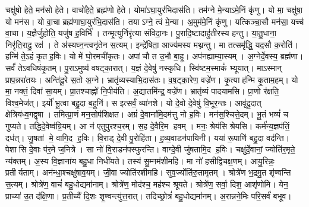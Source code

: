 चक्षु॑षो हेते॒ मन॑सो हेते। वाचो॑हेते॒ ब्रह्म॑णो हेते।
योमा॑ऽघा॒युर॑भिदास॑ति। तम॑ग्ने मे॒न्याऽमे॒निं कृ॑णु।
यो मा॒ चक्षु॑षा॒ यो मन॑स। यो वा॒चा ब्रह्म॑णाघा॒युर॑भि॒दास॑ति।
तयाऽग्ने॒ त्वं मे॒न्या। अ॒मुम॑मे॒निं कृ॑णु।
यत्किञ्चा॒सौ मन॑सा॒ यच्च॑ वा॒चा। य॒ज्ञैर्जु॒होति॒ यजु॑ष ह॒विर्भि॑।
तन्मृ॒त्युर्निरृ॑त्या संविदा॒नः। पु॒रादि॒ष्टादाहु॑तीरस्य हन्तु।
या॒तु॒धाना॒ निरृ॑ति॒रादु॒ रक्ष॑। ते अ॑स्यघ्न॒न्त्वनृ॑तेन स॒त्यम्।
इन्द्रे॑षिता॒ आज्य॑मस्य मथ्नन्तु। मा तत्समृ॑द्धि॒ यद॒सौ क॒रोति॑।
हन्मि॑ ते॒ऽहं कृ॒तह॒विः। यो मे॑ घो॒रमची॑कृतः।
अपांचौ त उ॒भौ बा॒हू। अप॑नह्याम्या॒स्यम्।
अ॒ग्नेर्दे॒वस्य॒ ब्रह्म॑णा। सर्वं॑ तेऽवधिषंकृ॒तम्।
पु॒राऽमुष्य॑ वषट्का॒रात्। य॒ज्ञं दे॒वेषु॑ नस्कृधि।
स्वि॑ष्टम॒स्माकं॑ भ्यूयात्। माऽस्मान् प्राप॒न्नरा॑तयः।
अन्ति॑दू॒रे स॒तो अ॒ग्ने। भ्रातृ॑व्यस्याभि॒दास॑तः।
व॒ष॒ट्का॒रेण॒ वज्रे॑ण। कृ॒त्याह॑न्मि कृ॒ताम॒हम्।
यो मा॒ नक्तं॒ दिवा॑ सा॒यम्। प्रा॒तश्चाह्नो॑ नि॒पीय॑ति।
अ॒द्यातमि॑न्द्र॒ वज्रे॑ण। भ्रातृ॑व्यं पादयामसि।
प्रा॒णो र॑क्षति॒ विश्व॒मेज॑त्। इर्यो॑ भू॒त्वा बहु॒दा ब॒हूनि॑।
स इत्सर्वं॒ व्या॑नशे। यो दे॒वो दे॒वेषु॑ वि॒भूर॒न्तः।
आवृ॑दू॒दात् क्षेत्रिय॑ध्व॒गद्वृषा। तमित्प्रा॒णं मन॒सोप॑शिक्षत।
अग्रं॑ दे॒वाना॑मि॒दम॑त्तु नो ह॒विः। मन॑स॒श्चित्ते॒दम्।
भू॒तं भव्यं॑ च गुप्यते। तद्धिदे॒वेष्व॑ग्रि॒यम्।
आ न॑ एतुपुरश्च॒रम्। स॒ह दे॒वैरि॒म हवम्।
मनः॒ श्रेय॑सि श्रेयसि। कर्म॑न्य॒ज्ञप॑तिं॒ दध॑त्।
जु॒षतां मे॒ वागि॒द ह॒विः। वि॒राड् दे॒वी पु॒रोहि॑ता।
ह॒व्य॒वाडन॑पायिनी। यया॑ रू॒पाणि॑ बहु॒दा वद॑न्ति।
पेशासि दे॒वाः प॑र॒मे ज॒नित्रे। सा नो॑ वि॒राडन॑पस्फुरन्ति।
वाग्दे॒वी जु॑षतामि॒द ह॒विः। चक्षु॑र्दे॒वानां॒ ज्योति॑र॒मृते॒ न्य॑क्तम्।
अ॒स्य वि॒ज्ञाना॑य बहु॒धा निधी॑यते। तस्य॑ सु॒म्नम॑शीमहि।
मा नो॑ हसीद्विचक्ष॒णम्। आयु॒रिन्नः॒ प्रतीर्यताम्।
अन॑न्धा॒श्चक्षु॑षाव॒यम्। जी॒वा ज्योति॑रशीमहि।
सुव॒र्ज्योति॑रु॒तामृतम्। श्रोत्रे॑ण भ॒द्रमु॒त शृ॑ण्वन्ति स॒त्यम्।
श्रोत्रे॑ण॒ वाचं॑ बहु॒धोद्यमा॑नाम्। श्रोत्रे॑ण॒ मोद॑श्च॒ मह॑श्च श्रूयते।
श्रोत्रे॑ण॒ सर्वा॒ दिश॒ आशृ॑णोमि। येन॒ प्राच्या॑ उ॒त द॑क्षि॒णा।
प्र॒तीच्यै॑ दि॒शः शृ॒ण्वन्त्यु॑त्त॒रात्। तदिच्छ्रोत्रं॑ बहु॒धोद्यमा॑नम्।
अ॒रान्नने॒मिः परि॒सर्वं॑ बभूव।


